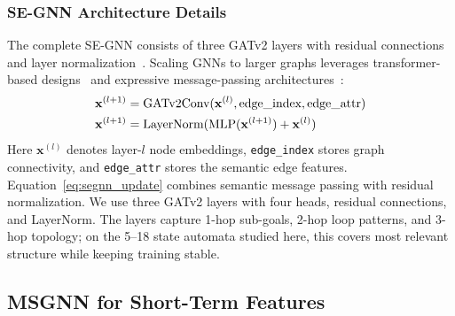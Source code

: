 \documentclass[conference]{IEEEtran}
\begin{document}
\subsubsection{SE-GNN Architecture Details}

The complete SE-GNN consists of three GATv2 layers with residual connections~\citep{He2016} and layer normalization~\citep{Ba2016}. Scaling GNNs to larger graphs leverages transformer-based designs~\citep{rampavsek2022recipe} and expressive message-passing architectures~\citep{brandstetter2022message}:
\begin{align}
\mathbf{x}^{(l+1)} &= \text{GATv2Conv}(\mathbf{x}^{(l)}, \text{edge\_index}, \text{edge\_attr}) \notag \\
\mathbf{x}^{(l+1)} &= \text{LayerNorm}(\text{MLP}(\mathbf{x}^{(l+1)}) + \mathbf{x}^{(l)})
\label{eq:segnn_update}
\end{align}
Here $\mathbf{x}^{(l)}$ denotes layer-$l$ node embeddings, \texttt{edge\_index} stores graph connectivity, and \texttt{edge\_attr} stores the semantic edge features. Equation~\ref{eq:segnn_update} combines semantic message passing with residual normalization. We use three GATv2 layers with four heads, residual connections, and LayerNorm. The layers capture 1-hop sub-goals, 2-hop loop patterns, and 3-hop topology; on the 5--18 state automata studied here, this covers most relevant structure while keeping training stable.

\subsection{MSGNN for Short-Term Features}
\end{document}
